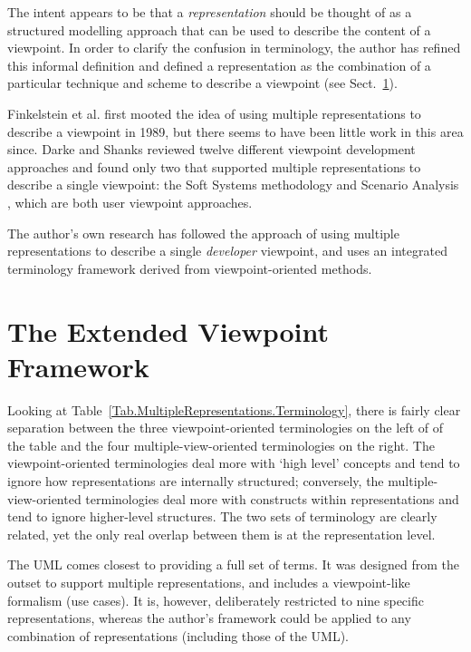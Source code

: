 \documentclass[10pt]{llncs}
\begin{document}
The intent appears to be that a \emph{representation} should be thought of as a structured modelling approach that can be used to describe the content of a viewpoint. In order to clarify the confusion in terminology, the author has refined this informal definition and defined a representation as the combination of a particular technique and scheme to describe a viewpoint (see Sect.~\ref{Sec:Framework}).

Finkelstein et al. \cite{Fink:ACW:1989} first mooted the idea of using multiple representations to describe a viewpoint in 1989, but there seems to have been little work in this area since. Darke and Shanks \cite{Dark:P:1996:RE} reviewed twelve different viewpoint development approaches and found only two that supported multiple representations to describe a single viewpoint: the Soft Systems methodology \cite{Chec:PB:1981:SSM} and Scenario Analysis \cite{Hsia:P:1994:Scenario}, which are both user viewpoint approaches.

The author's own research \cite{Stan:N:1999:PhD,Stan:N:1997:ECIS97} has followed the approach of using multiple representations to describe a single \emph{developer} viewpoint, and uses an integrated terminology framework derived from viewpoint-oriented methods.


\section{The Extended Viewpoint Framework}
\label{Sec:Framework}

Looking at Table~\ref{Tab.MultipleRepresentations.Terminology}, there is fairly clear separation between the three viewpoint-oriented terminologies on the left of of the table and the four multiple-view-oriented terminologies on the right. The viewpoint-oriented terminologies deal more with `high level' concepts and tend to ignore how representations are internally structured; conversely, the multiple-view-oriented terminologies deal more with constructs within representations and tend to ignore higher-level structures. The two sets of terminology are clearly related, yet the only real overlap between them is at the representation level.

The UML comes closest to providing a full set of terms. It was designed from the outset to support multiple representations, and includes a viewpoint-like formalism (use cases). It is, however, deliberately restricted to nine specific representations, whereas the author's framework could be applied to any combination of representations (including those of the UML).
\end{document}
